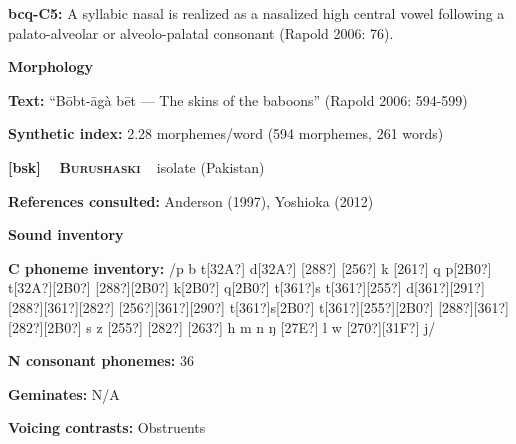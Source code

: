 \begin{styleBody}
\textbf{bcq-C5: }A syllabic nasal is realized as a nasalized high central vowel following a palato-alveolar or alveolo-palatal consonant (Rapold 2006: 76).
\end{styleBody}

\begin{styleBody}
\textbf{Morphology}
\end{styleBody}

\begin{styleBody}
\textbf{Text:} “B\=obt-\=agà b\=et — The skins of the baboons” (Rapold 2006: 594-599)
\end{styleBody}

\begin{styleBody}
\textbf{Synthetic index: }2.28 morphemes/word (594 morphemes, 261 words)
\end{styleBody}

\clearpage\begin{styleBody}
\textbf{[bsk] }\ \ \textbf{\textsc{Burushaski}}\textbf{\ \ }isolate (Pakistan)
\end{styleBody}

\begin{styleBody}
\textbf{References consulted: }Anderson (1997), Yoshioka (2012)
\end{styleBody}

\begin{styleBody}
\textbf{Sound inventory}
\end{styleBody}

\begin{styleBody}
\textbf{C phoneme inventory:} /p b t[32A?] d[32A?] [288?] [256?] k [261?] q p[2B0?] t[32A?][2B0?] [288?][2B0?] k[2B0?] q[2B0?] t[361?]s t[361?][255?] d[361?][291?] [288?][361?][282?] [256?][361?][290?] t[361?]s[2B0?] t[361?][255?][2B0?] [288?][361?][282?][2B0?] s z [255?] [282?] [263?] h m n ŋ [27E?] l w [270?][31F?] j/
\end{styleBody}

\begin{styleBody}
\textbf{N consonant phonemes:} 36
\end{styleBody}

\begin{styleBody}
\textbf{Geminates:} N/A
\end{styleBody}

\begin{styleBody}
\textbf{Voicing contrasts:} Obstruents
\end{styleBody}

